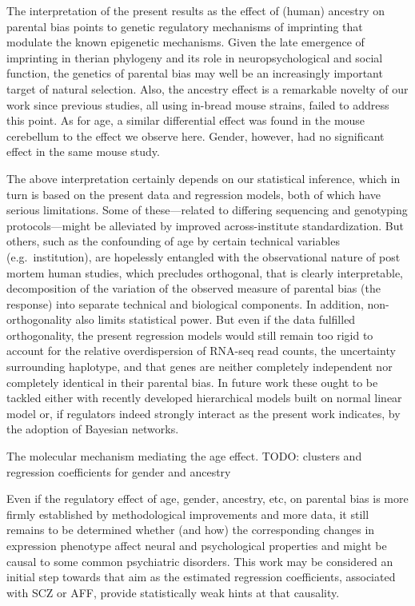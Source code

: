 \documentclass[letterpaper]{article}
\begin{document}
The interpretation of the present results as the effect of (human) ancestry on
parental bias points to genetic regulatory mechanisms of imprinting that
modulate the known epigenetic mechanisms.  Given the late emergence of
imprinting in therian phylogeny and its role in neuropsychological and social
function, the genetics of parental bias may well be an increasingly important
target of natural selection.  Also, the ancestry effect is a remarkable
novelty of our work since previous studies, all using in-bread mouse strains,
failed to address this point.  As for age, a similar differential effect was
found in the mouse cerebellum to the effect we observe here. Gender, however,
had no significant effect in the same mouse study.

The above interpretation certainly depends on our statistical inference, which
in turn is based on the present data and regression models, both of which have
serious limitations.  Some of these---related to differing sequencing and
genotyping protocols---might be alleviated by improved across-institute
standardization.  But others, such as the confounding of age by certain
technical variables (e.g.~institution), are hopelessly entangled with the
observational nature of post mortem human studies, which precludes orthogonal,
that is clearly interpretable, decomposition of the variation of the observed
measure of parental bias (the response) into separate technical and biological
components.  In addition, non-orthogonality also limits statistical power.  But even
if the data fulfilled orthogonality, the present regression models would still
remain too rigid to account for the relative overdispersion of RNA-seq read
counts, the uncertainty surrounding haplotype, and that genes are neither
completely independent nor completely identical in their parental bias.  In
future work these ought to be tackled either with recently developed
hierarchical models built on normal linear model \cite{Perez2015,Law2014} or,
if regulators indeed strongly interact as the present work indicates, by the
adoption of Bayesian networks.

The molecular mechanism mediating the age effect.  TODO: clusters and regression
coefficients for gender and ancestry

Even if the regulatory effect of age, gender, ancestry, etc, on parental bias
is more firmly established by methodological improvements and more data, it
still remains to be determined whether (and how) the corresponding changes in
expression phenotype affect neural and psychological properties and might be
causal to some common psychiatric disorders.  This work may be considered an
initial step towards that aim as the estimated regression coefficients,
associated with SCZ or AFF, provide statistically weak hints at that
causality.
\end{document}
